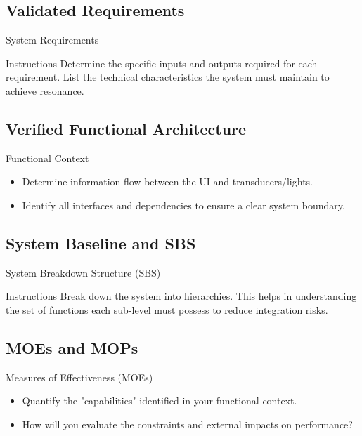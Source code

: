 \documentclass[aspectratio=169, 10pt, shadow]{beamer}
\begin{document}
\subsection{Validated Requirements}
\begin{frame}{System Requirements}
  \begin{block}{Instructions}
    Determine the specific inputs and outputs required for each requirement. List the technical characteristics the system must maintain to achieve resonance.
  \end{block}
\end{frame}

\subsection{Verified Functional Architecture}
\begin{frame}{Functional Context}
  \centering
  \begin{itemize}
      \item Determine information flow between the UI and transducers/lights.
      \item Identify all interfaces and dependencies to ensure a clear system boundary.
  \end{itemize}
\end{frame}

\subsection{System Baseline and SBS}
\begin{frame}{System Breakdown Structure (SBS)}
  \begin{block}{Instructions}
    Break down the system into hierarchies. This helps in understanding the set of functions each sub-level must possess to reduce integration risks.
  \end{block}
\end{frame}

\subsection{MOEs and MOPs}
\begin{frame}{Measures of Effectiveness (MOEs)}
  \begin{itemize}
      \item Quantify the "capabilities" identified in your functional context.
      \item How will you evaluate the constraints and external impacts on performance?
  \end{itemize}
\end{frame}
\end{document}
